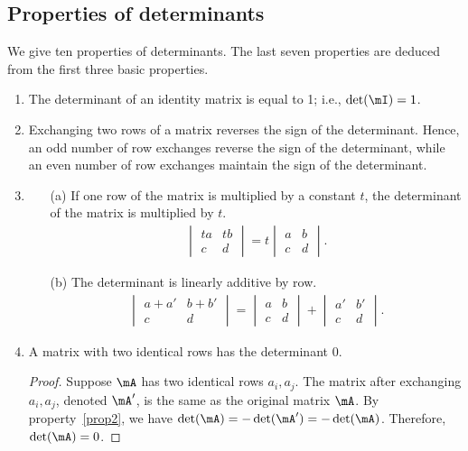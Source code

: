 \documentclass[11pt]{article}
\theoremstyle{plain}
\theoremstyle{definition}
\begin{document}
\subsection{Properties of determinants}
We give ten properties of determinants. The last seven properties are deduced from the first three basic properties.
\begin{enumerate}
	\item\label{prop1} The determinant of an identity matrix is equal to 1; i.e., $\det(\mI) = 1$.
	\item\label{prop2} Exchanging two rows of a matrix reverses the sign of the determinant. Hence, an odd number of row exchanges reverse the sign of the determinant, while an even number of row exchanges maintain the sign of the determinant.
	\item\label{prop3} \begin{enumerate} 
	\item[(a)] If one row of the matrix is multiplied by a constant $t$, the determinant of the matrix is multiplied by $t$.
	\begin{align}
		\begin{vmatrix}
			ta&tb\\c &d 
		\end{vmatrix} = t \begin{vmatrix}
			a&b\\c &d
			\end{vmatrix}.
	\end{align} 
	\item[(b)] The determinant is linearly additive by row.
	\begin{align}
		\begin{vmatrix}
			a+a'&b+b'\\c &d 
		\end{vmatrix} =  \begin{vmatrix}
			a&b\\c &d
			\end{vmatrix} +  \begin{vmatrix}
			a'&b'\\c &d
			\end{vmatrix}. 
	\end{align}
	\end{enumerate}

	\item \label{propidenticalrow} A matrix with two identical rows has the determinant 0.  
	\begin{proof}
		Suppose $\mA$ has two identical rows $a_i, a_j$. The matrix after exchanging $a_i, a_j$, denoted $\mA'$, is the same as the original matrix $\mA$. By property~\ref{prop2}, we have $\det(\mA) = -\det(\mA') = -\det(\mA)$. Therefore, $\det(\mA) = 0$.
	\end{proof}


\end{enumerate}
\end{document}
